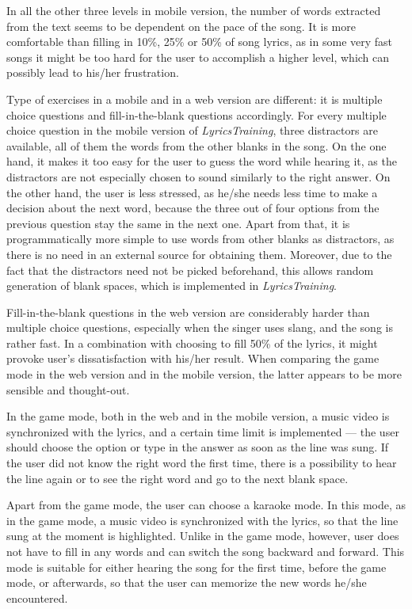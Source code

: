 In all the other three levels in mobile version, the number of words extracted from the text seems to be dependent on the pace of the song. It is more comfortable than filling in 10\%, 25\% or 50\% of song lyrics, as in some very fast songs it might be too hard for the user to accomplish a higher level, which can possibly lead to his/her frustration.

Type of exercises in a mobile and in a web version are different: it is multiple choice questions and fill-in-the-blank questions accordingly. For every multiple choice question in the mobile version of \textit{LyricsTraining}, three distractors are available, all of them the words from the other blanks in the song. On the one hand, it makes it too easy for the user to guess the word while hearing it, as the distractors are not especially chosen to sound similarly to the right answer. On the other hand, the user is less stressed, as he/she needs less time to make a decision about the next word, because the three out of four options from the previous question stay the same in the next one. Apart from that, it is programmatically more simple to use words from other blanks as distractors, as there is no need in an external source for obtaining them. Moreover, due to the fact that the distractors need not be picked beforehand, this allows random generation of blank spaces, which is implemented in \textit{LyricsTraining}. 

Fill-in-the-blank questions in the web version are considerably harder than multiple choice questions, especially when the singer uses slang, and the song is rather fast. In a combination with choosing to fill 50\% of the lyrics, it might provoke user's dissatisfaction with his/her result. When comparing the game mode in the web version and in the mobile version, the latter appears to be more sensible and thought-out.

In the game mode, both in the web and in the mobile version, a music video is synchronized with the lyrics, and a certain time limit is implemented --- the user should choose the option or type in the answer as soon as the line was sung. If the user did not know the right word the first time, there is a possibility to hear the line again or to see the right word and go to the next blank space.

Apart from the game mode, the user can choose a karaoke mode. In this mode, as in the game mode, a music video is synchronized with the lyrics, so that the line sung at the moment is highlighted. Unlike in the game mode, however, user does not have to fill in any words and can switch the song backward and forward. This mode is suitable for either hearing the song for the first time, before the game mode, or afterwards, so that the user can memorize the new words he/she encountered.

